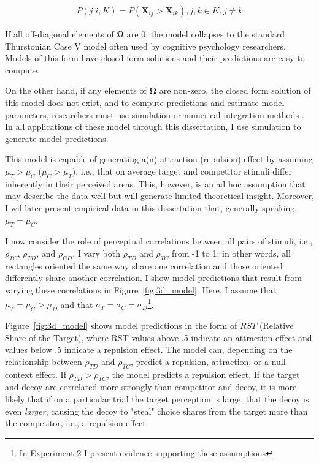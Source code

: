 \begin{align}
   P(j|i,K)=P(\mathbf{X}_{ij}>\mathbf{X}_{ik}), j,k \in K, j \neq k
   \label{eqn:pchoice}
\end{align}

If all off-diagonal elements of $\boldsymbol{\Omega}$ are $0$, the model collapses to the standard Thurstonian Case V model \parencite{thurstone1927law} often used by cognitive psychology researchers. Models of this form have closed form solutions and their predictions are easy to compute.

On the other hand, if any elements of $\boldsymbol{\Omega}$ are non-zero, the closed form solution of this model does not exist, and to compute predictions and estimate model parameters, researchers must use simulation or numerical integration methods \parencite{train2009discrete}. In all applications of these model through this dissertation, I use simulation to generate model predictions. 

This model is capable of generating a(n) attraction (repulsion) effect by assuming $\mu_{T}>\mu_{C}$ ($\mu_{C}>\mu_{T}$), i.e., that on average target and competitor stimuli differ inherently in their perceived areas. This, however, is an ad hoc assumption that may describe the data well but will generate limited theoretical insight. Moreover, I wil later present empirical data in this dissertation that, generally speaking, $\mu_{T}=\mu_{C}$. 

I now consider the role of perceptual correlations between all pairs of stimuli, i.e., $\rho_{TC}$, $\rho_{TD}$, and $\rho_{CD}$. I vary both $\rho_{TD}$ and $\rho_{TC}$ from -1 to 1; in other words, all rectangles oriented the same way share one correlation and those oriented differently share another correlation. I show model predictions that result from varying these correlations in Figure~\ref{fig:3d_model}. Here, I assume that $\mu_{T}=\mu_{C}>\mu_{D}$ and that $\sigma_{T}=\sigma_{C}=\sigma_{D}$\footnote{In Experiment 2 I present evidence supporting these assumptions}. 

Figure~\ref{fig:3d_model} shows model predictions in the form of $RST$ (Relative Share of the Target), where RST values above .5 indicate an attraction effect and values below .5 indicate a repulsion effect. The model can, depending on the relationship between $\rho_{TD}$ and $\rho_{TC}$, predict a repulsion, attraction, or a null context effect. If $\rho_{TD}>\rho_{TC}$, the model predicts a repulsion effect. If the target and decoy are correlated more strongly than competitor and decoy, it is more likely that if on a particular trial the target perception is large, that the decoy is even \textit{larger}, causing the decoy to "steal" choice shares from the target more than the competitor, i.e., a repulsion effect.

